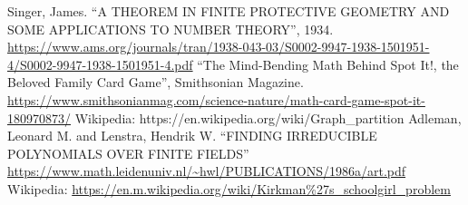 \documentclass[11pt, oneside]{article} 	%
\begin{document}
\begin{thebibliography}{9}
 Singer, James. ``A THEOREM IN FINITE PROTECTIVE GEOMETRY AND SOME APPLICATIONS TO NUMBER THEORY'', 1934.  \url{https://www.ams.org/journals/tran/1938-043-03/S0002-9947-1938-1501951-4/S0002-9947-1938-1501951-4.pdf} 
 ``The Mind-Bending Math Behind Spot It!, the Beloved Family Card Game'', Smithsonian Magazine.  \url{https://www.smithsonianmag.com/science-nature/math-card-game-spot-it-180970873/}
 Wikipedia: {https://en.wikipedia.org/wiki/Graph\_partition}
 Adleman, Leonard M. and Lenstra, Hendrik W.  ``FINDING IRREDUCIBLE POLYNOMIALS OVER FINITE FIELDS'' \url{https://www.math.leidenuniv.nl/~hwl/PUBLICATIONS/1986a/art.pdf}
 Wikipedia: \url{https://en.m.wikipedia.org/wiki/Kirkman\%27s_schoolgirl_problem}
\end{thebibliography}


\end{document}
